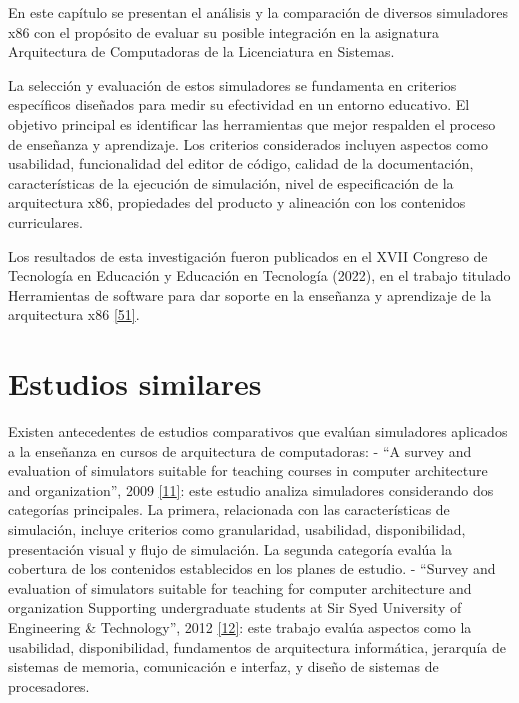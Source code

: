 \documentclass[12pt,oneside]{templates/unerthesis}
\begin{document}
En este capítulo se presentan el análisis y la comparación de diversos simuladores x86 con el propósito de evaluar su posible integración en la asignatura Arquitectura de Computadoras de la Licenciatura en Sistemas.

La selección y evaluación de estos simuladores se fundamenta en criterios específicos diseñados para medir su efectividad en un entorno educativo. El objetivo principal es identificar las herramientas que mejor respalden el proceso de enseñanza y aprendizaje. Los criterios considerados incluyen aspectos como usabilidad, funcionalidad del editor de código, calidad de la documentación, características de la ejecución de simulación, nivel de especificación de la arquitectura x86, propiedades del producto y alineación con los contenidos curriculares.

Los resultados de esta investigación fueron publicados en el XVII Congreso de Tecnología en Educación y Educación en Tecnología (2022), en el trabajo titulado Herramientas de software para dar soporte en la enseñanza y aprendizaje de la arquitectura x86 \protect\hyperlink{ref-colombani_herramientas_2022}{{[}51{]}}.

\hypertarget{estudios-similares}{%
\section{Estudios similares}\label{estudios-similares}}

Existen antecedentes de estudios comparativos que evalúan simuladores aplicados a la enseñanza en cursos de arquitectura de computadoras:
- ``A survey and evaluation of simulators suitable for teaching courses in computer architecture and organization'', 2009 \protect\hyperlink{ref-nikolic_survey_2009}{{[}11{]}}: este estudio analiza simuladores considerando dos categorías principales. La primera, relacionada con las características de simulación, incluye criterios como granularidad, usabilidad, disponibilidad, presentación visual y flujo de simulación. La segunda categoría evalúa la cobertura de los contenidos establecidos en los planes de estudio.
- ``Survey and evaluation of simulators suitable for teaching for computer architecture and organization Supporting undergraduate students at Sir Syed University of Engineering \& Technology'', 2012 \protect\hyperlink{ref-hasan_survey_2012}{{[}12{]}}: este trabajo evalúa aspectos como la usabilidad, disponibilidad, fundamentos de arquitectura informática, jerarquía de sistemas de memoria, comunicación e interfaz, y diseño de sistemas de procesadores.
\end{document}
